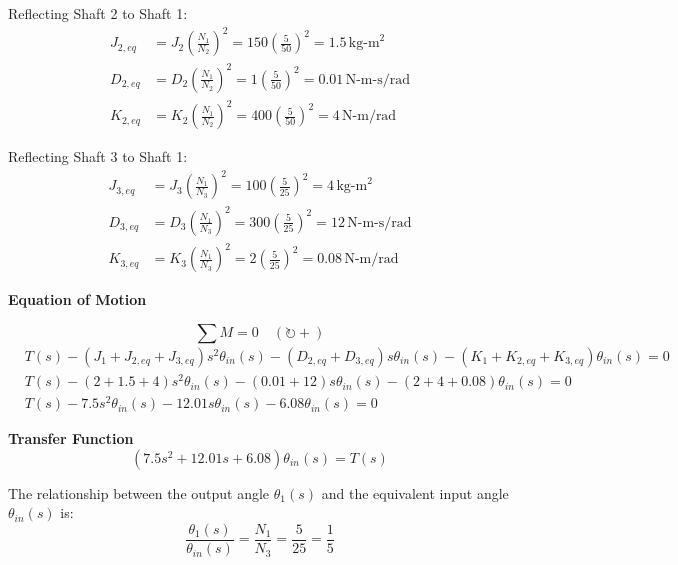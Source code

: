 \documentclass[11pt]{article}
\begin{document}
{Reflecting Shaft 2 to Shaft 1:}
\begin{align*}
    J_{2,eq} &= J_2\left(\frac{N_1}{N_2}\right)^2 = 150\left(\frac{5}{50}\right)^2 = 1.5 \, \text{kg-m}^2 \\
    D_{2,eq} &= D_2\left(\frac{N_1}{N_2}\right)^2 = 1\left(\frac{5}{50}\right)^2 = 0.01 \, \text{N-m-s/rad} \\
    K_{2,eq} &= K_2\left(\frac{N_1}{N_2}\right)^2 = 400\left(\frac{5}{50}\right)^2 = 4 \, \text{N-m/rad}
\end{align*}
\vspace{10pt}

{Reflecting Shaft 3 to Shaft 1:}
\begin{align*}
    J_{3,eq} &= J_3\left(\frac{N_1}{N_3}\right)^2 = 100\left(\frac{5}{25}\right)^2 = 4 \, \text{kg-m}^2 \\
    D_{3,eq} &= D_3\left(\frac{N_1}{N_3}\right)^2 = 300\left(\frac{5}{25}\right)^2 = 12 \, \text{N-m-s/rad} \\
    K_{3,eq} &= K_3\left(\frac{N_1}{N_3}\right)^2 = 2\left(\frac{5}{25}\right)^2 = 0.08 \, \text{N-m/rad}
\end{align*}

\noindent\textbf{Equation of Motion}
\vspace{5pt}

\[
\sum M = 0 \quad (\circlearrowright +)
\]
\begin{align*}
    & T(s) - (J_1 + J_{2,eq} + J_{3,eq})s^2\theta_{in}(s) - (D_{2,eq} + D_{3,eq})s\theta_{in}(s) - (K_1 + K_{2,eq} + K_{3,eq})\theta_{in}(s) = 0 \\
    & T(s) - (2 + 1.5 + 4)s^2\theta_{in}(s) - (0.01 + 12)s\theta_{in}(s) - (2 + 4 + 0.08)\theta_{in}(s) = 0 \\
    & T(s) - 7.5s^2\theta_{in}(s) - 12.01s\theta_{in}(s) - 6.08\theta_{in}(s) = 0
\end{align*}

\vspace{10pt} 

\noindent\textbf{Transfer Function}
\begin{equation*}
 (7.5s^2 + 12.01s + 6.08)\theta_{in}(s) = T(s)
\end{equation*}

The relationship between the output angle $\theta_1(s)$ and the equivalent input angle $\theta_{in}(s)$ is:
\begin{equation*}
    \frac{\theta_1(s)}{\theta_{in}(s)} = \frac{N_1}{N_3} = \frac{5}{25} = \frac{1}{5}
\end{equation*}
\end{document}
